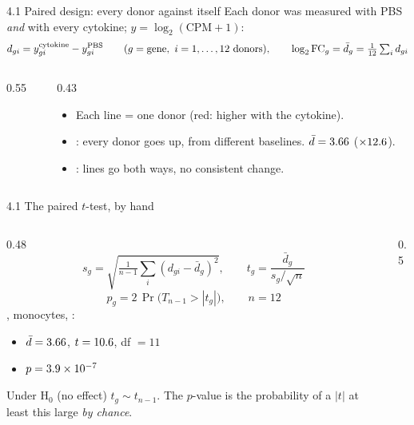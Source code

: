 \begin{frame}{4.1 Paired design: every donor against itself}
  Each donor was measured with PBS \emph{and} with every cytokine; $y=\log_2(\text{CPM}+1)$:
  \[ d_{gi}=y^{\text{cytokine}}_{gi}-y^{\text{PBS}}_{gi}\qquad(g=\text{gene},\ i=1,\dots,12\ \text{donors}),\qquad \lfc_g=\bar d_g=\tfrac1{12}\textstyle\sum_i d_{gi} \]
  \begin{columns}[c]
    \begin{column}{0.55\linewidth}
    \end{column}
    \begin{column}{0.43\linewidth}\small
      \begin{itemize}\setlength\itemsep{3pt}
        \item Each line = one donor (red: higher with the cytokine).
        \item {}: every donor goes up, from different baselines. $\bar d=3.66$ ($\times12.6$).
        \item {}: lines go both ways, no consistent change.
      \end{itemize}
    \end{column}
  \end{columns}
\end{frame}

\begin{frame}{4.1 The paired $t$-test, by hand}
  \begin{columns}[c]
    \begin{column}{0.48\linewidth}
      \[
        s_g=\sqrt{\tfrac1{n-1}\textstyle\sum_i(d_{gi}-\bar d_g)^2},\qquad
        t_g=\frac{\bar d_g}{s_g/\sqrt n}
      \]
      \[ p_g=2\,\Pr\bigl(T_{n-1}>|t_g|\bigr),\qquad n=12 \]
      \small
      , monocytes, \IFNg:
      \begin{itemize}\setlength\itemsep{1pt}
        \item $\bar d=3.66$, \quad $t=10.6$, \quad df $=11$
        \item $p=3.9\times10^{-7}$
      \end{itemize}
      Under H$_0$ (no effect) $t_g\sim t_{n-1}$. The $p$-value is the probability of a $|t|$ at least this large \emph{by chance}.
    \end{column}
    \begin{column}{0.5\linewidth}
    \end{column}
  \end{columns}
\end{frame}

